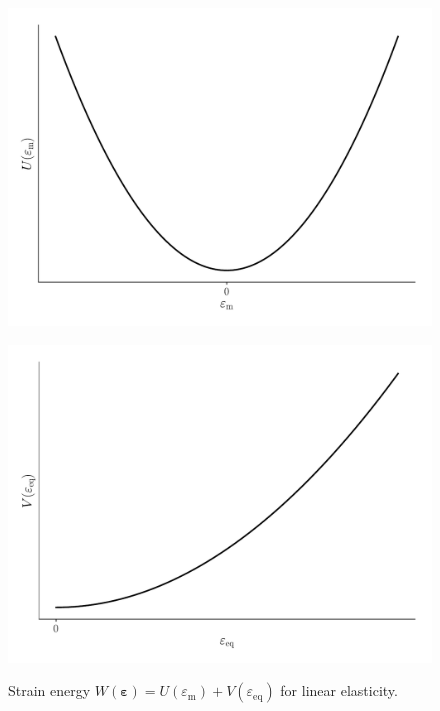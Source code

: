 \documentclass[times,namecite]{goose-article}
\begin{document}
\begin{figure}[htp]
  \centering
  \captionsetup[subfigure]{justification=centering}
  \begin{minipage}[t]{.49\textwidth}
    \centering
    \includegraphics[width=1.\textwidth]{figures/potential_U}
    \label{fig:U}
  \end{minipage}
  \hfill
  \begin{minipage}[t]{.49\textwidth}
    \centering
    \includegraphics[width=1.\textwidth]{figures/potential_V-elas}
    \label{fig:V-elas}
  \end{minipage}
  \caption{Strain energy $W ( \bm{\varepsilon} ) = U ( \varepsilon_\mathrm{m} ) + V ( \varepsilon_\mathrm{eq} )$ for linear elasticity.}
  \label{fig:W-elas}
\end{figure}
\end{document}
